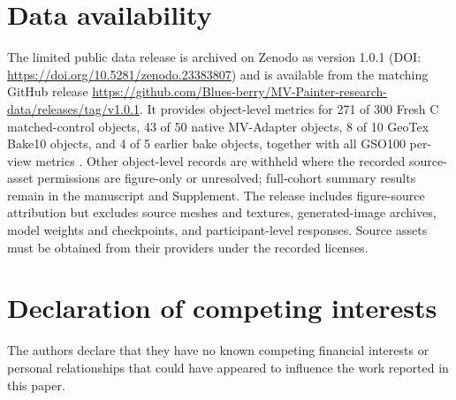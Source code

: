 \documentclass[times,twocolumn,final]{elsarticle}
\begin{document}
\section*{Data availability}

The limited public data release is archived on Zenodo as version 1.0.1 (DOI: \url{https://doi.org/10.5281/zenodo.23383807}) and is available from the matching GitHub release \url{https://github.com/Blues-berry/MV-Painter-research-data/releases/tag/v1.0.1}. It provides object-level metrics for 271 of 300 Fresh C matched-control objects, 43 of 50 native MV-Adapter objects, 8 of 10 GeoTex Bake10 objects, and 4 of 5 earlier bake objects, together with all GSO100 per-view metrics \cite{mvpainterlimiteddata2026}. Other object-level records are withheld where the recorded source-asset permissions are figure-only or unresolved; full-cohort summary results remain in the manuscript and Supplement. The release includes figure-source attribution but excludes source meshes and textures, generated-image archives, model weights and checkpoints, and participant-level responses. Source assets must be obtained from their providers under the recorded licenses.

\section*{Declaration of competing interests}

The authors declare that they have no known competing financial interests or personal relationships that could have appeared to influence the work reported in this paper.
\end{document}
